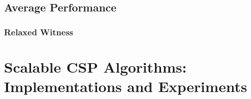 \documentclass[screen,sigconf,anonymous,review]{acmart}
\begin{document}
\subsection{Average Performance}
\label{sec:avg_hd}


\subsubsection{Relaxed Witness}
\label{sec:relaxed_witness}


\section{Scalable CSP Algorithms:\texorpdfstring{\\}{ } Implementations and Experiments}
\label{sec:numeric}





\clearpage

 

%
%
%
%
%
%
%
%
\end{document}
